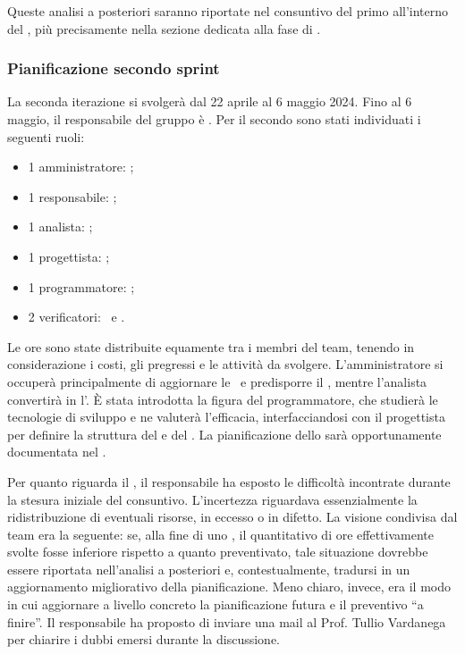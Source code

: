 \vspace{0.5\baselineskip}
\par Queste analisi a posteriori saranno riportate nel consuntivo del primo  all'interno del \PdP, più precisamente nella sezione dedicata alla fase di .

\subsubsection{Pianificazione secondo sprint}
\par La seconda iterazione si svolgerà dal 22 aprile al 6 maggio 2024. Fino al 6 maggio, il
responsabile del gruppo è \raul. Per il secondo  sono stati individuati i seguenti ruoli:
\begin{itemize}
	\item 1 amministratore: \riccardo;
	\item 1 responsabile: \raul;
	\item 1 analista: \tommaso;
	\item 1 progettista: \sebastiano;
  \item 1 programmatore: \marco;
	\item 2 verificatori: \mattia\ e \martina.
\end{itemize}

\vspace{0.5\baselineskip}
\par Le ore sono state distribuite equamente tra i membri del team, tenendo in considerazione i costi, gli  pregressi e le attività da svolgere. L'amministratore si occuperà principalmente di aggiornare le \NdP\ e predisporre il \PdQ, mentre l'analista convertirà in  l'\AdR. È stata introdotta la figura del programmatore, che studierà le tecnologie di sviluppo e ne valuterà l'efficacia, interfacciandosi con il progettista per definire la struttura del  e del . La pianificazione dello  sarà opportunamente documentata nel \PdP. 
\par Per quanto riguarda il \PdP, il responsabile ha esposto le difficoltà incontrate durante la stesura iniziale del consuntivo. L'incertezza riguardava essenzialmente la ridistribuzione di eventuali risorse, in eccesso o in difetto. La visione condivisa dal team era la seguente: se, alla fine di uno , il quantitativo di ore effettivamente svolte fosse inferiore rispetto a quanto preventivato, tale situazione dovrebbe essere riportata nell'analisi a posteriori e, contestualmente, tradursi in un aggiornamento migliorativo della pianificazione. Meno chiaro, invece, era il modo in cui aggiornare a livello concreto la pianificazione futura e il preventivo “a finire”. Il responsabile ha proposto di inviare una mail al Prof. Tullio Vardanega per chiarire i dubbi emersi durante la discussione.

